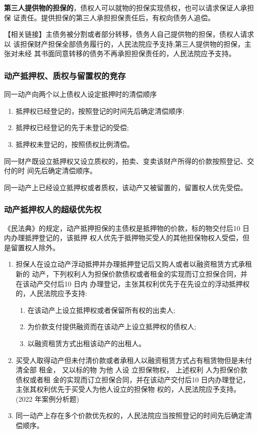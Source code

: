\documentclass[UTF8,12pt]{ctexart}
\numberwithin{equation}{section} %
\numberwithin{figure}{section}
\numberwithin{table}{section}
\begin{document}
	\textbf{第三人提供物的担保的}，债权人可以就物的担保实现债权，也可以请求保证人承担保 证责任。提供担保的第三人承担担保责任后，有权向债务人追偿。
	
	【相关链接】主债务被分割或者部分转移，债务人自己提供物的担保，债权人请求以 该担保财产担保全部债务履行的，人民法院应予支持;第三人提供物的担保，主张对未经 其书面同意转移的债务不再承担担保责任的，人民法院应予支持。

	
	\subsubsection{动产抵押权、质权与留置权的竞存}
	同一动产向两个以上债权人设定抵押时的清偿顺序
	\begin{enumerate}
		\item 抵押权已经登记的，按照登记的时间先后确定清偿顺序;
		
		\item 抵押权已经登记的先于未登记的受偿;
		
		\item 抵押权未登记的，按照债权比例清偿。
	\end{enumerate}
	
	同一财产既设立抵押权又设立质权的，拍卖、变卖该财产所得的价款按照登记、交付的时 间先后确定清偿顺序。
	
	同一动产上已经设立抵押权或者质权，该动产又被留置的，留置权人优先受偿。
	
	\subsubsection{动产抵押权人的超级优先权}
	《民法典》的规定，动产抵押担保的主债权是抵押物的价款，标的物交付后10 日内办理抵押登记的，该抵押 权人优先于抵押物买受人的其他担保物权人受偿，但是留置权人除外。
	\begin{enumerate}
		\item 担保人在设立动产浮动抵押并办理抵押登记后又购人或者以融资租赁方式承租新的 动产，下列权利人为担保价款债权或者租金的实现而订立担保合同，并在该动产交付后10 日内 办理登记，主张其权利优先于在先设立的浮动抵押权的，人民法院应予支持:
		\begin{enumerate}
			\item 在该动产上设立抵押权或者保留所有权的出卖人; 
			
			\item 为价款支付提供融资而在该动产上设立抵押权的债权人; 
			
			\item 以融资租赁方式出租该动产的出租人。
		\end{enumerate}
		
		\item 买受人取得动产但未付清价款或者承租人以融资租赁方式占有租赁物但是未付清全部 租金， 又以标的物 为他 人设 立担保物权， 上述权利 人为担保价款债权或者租 金的实现而订立担保合同，并在该动产交付后10 日内办理登记，主张其权利优先于买受人为他人设立的担保物 权的，人民法院应予支持。(2022 年案例分析题)
		
		\item 同一动产上存在多个价款优先权的，人民法院应当按照登记的时间先后确定清偿顺序。
	\end{enumerate}
	
\end{document}
